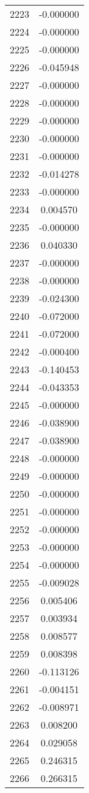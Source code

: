 \documentclass[12pt]{article}
\begin{document}
\begin{longtable}{@{}cc@{}}
2223 & -0.000000 \\
2224 & -0.000000 \\
2225 & -0.000000 \\
2226 & -0.045948 \\
2227 & -0.000000 \\
2228 & -0.000000 \\
2229 & -0.000000 \\
2230 & -0.000000 \\
2231 & -0.000000 \\
2232 & -0.014278 \\
2233 & -0.000000 \\
2234 & 0.004570 \\
2235 & -0.000000 \\
2236 & 0.040330 \\
2237 & -0.000000 \\
2238 & -0.000000 \\
2239 & -0.024300 \\
2240 & -0.072000 \\
2241 & -0.072000 \\
2242 & -0.000400 \\
2243 & -0.140453 \\
2244 & -0.043353 \\
2245 & -0.000000 \\
2246 & -0.038900 \\
2247 & -0.038900 \\
2248 & -0.000000 \\
2249 & -0.000000 \\
2250 & -0.000000 \\
2251 & -0.000000 \\
2252 & -0.000000 \\
2253 & -0.000000 \\
2254 & -0.000000 \\
2255 & -0.009028 \\
2256 & 0.005406 \\
2257 & 0.003934 \\
2258 & 0.008577 \\
2259 & 0.008398 \\
2260 & -0.113126 \\
2261 & -0.004151 \\
2262 & -0.008971 \\
2263 & 0.008200 \\
2264 & 0.029058 \\
2265 & 0.246315 \\
2266 & 0.266315 \\

\end{longtable}
\end{document}
